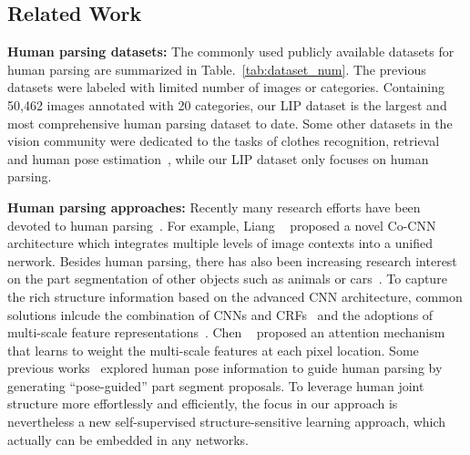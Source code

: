 \documentclass[10pt,twocolumn,letterpaper]{article}
\begin{document}
\subsection{Related Work}
\textbf{Human parsing datasets:}
The commonly used publicly available datasets for human parsing are summarized in Table.~\ref{tab:dataset_num}. The previous datasets were labeled with limited number of images or categories. \iffalse The largest one~\cite{Co-CNN} so far only contains 17,000 fashion images with mostly upright fashion models.\fi Containing 50,462 images annotated with 20 categories, our LIP dataset is the largest and most comprehensive human parsing dataset to date. Some other datasets in the vision community were dedicated to the tasks of clothes recognition, retrieval~\cite{liuLQWTcvpr16DeepFashion,WhereToBuyItICCV15} and human pose estimation~\cite{andriluka14cvpr,h36m_pami}, while our LIP dataset only focuses on human parsing.

\textbf{Human parsing approaches:}  
Recently many research efforts have been devoted to human parsing~\cite{Co-CNN,yamaguchi2012parsing,Yamaguchiparsing13,SimoSerraACCV2014,M-CNN,xia2015zoom,chen2015attention}. For example, Liang \etal~\cite{Co-CNN} proposed a novel Co-CNN architecture which integrates multiple levels of image contexts into a unified nerwork. Besides human parsing, there has also been increasing research interest on the part segmentation of other objects such as animals or cars~\cite{wang2014semantic,wang2015joint,lu2014parsing}. To capture the rich structure information based on the advanced CNN architecture, common solutions inlcude the combination of CNNs and CRFs~\cite{chen2014semantic,crfasrnn} and the adoptions of multi-scale feature representations~\cite{chen2014semantic,chen2015attention,xia2015zoom}. Chen \etal~\cite{chen2015attention} proposed an attention mechanism that learns to weight the multi-scale features at each pixel location. Some previous works~\cite{dong2014towards,xia2016pose} explored human pose information to guide human parsing by generating ``pose-guided'' part segment proposals. To leverage human joint structure more effortlessly and efficiently, the focus in our approach is nevertheless a new self-supervised structure-sensitive learning approach, which actually can be embedded in any networks.

\end{document}
